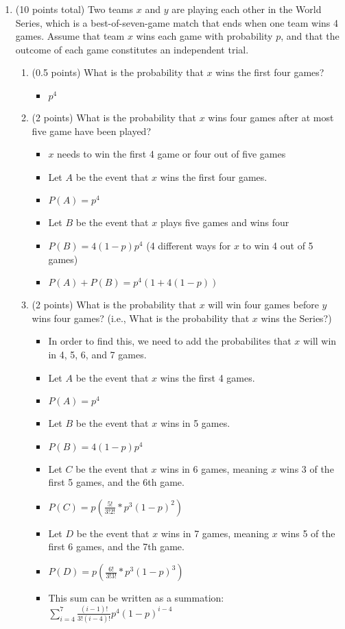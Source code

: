 \documentclass[11pt]{article}
\begin{document}
\begin{enumerate}

\item (10 points total) Two teams $x$ and $y$ are playing each other in the
World Series, which is a best-of-seven-game match that ends when one
team wins 4 games.  Assume that team $x$ wins each game with probability
$p$, and that the outcome of each game constitutes an independent trial.

\begin{enumerate}
\item (0.5 points) What is the probability that $x$ wins the first four games?

\begin{itemize}
	\item $p^{4}$
\end{itemize}

\item (2 points) What is the probability that $x$ wins four games after
at most five game have been played?
\begin{itemize}
	\item $x$ needs to win the first 4 game or four out of five games
	\item Let $A$ be the event that $x$ wins the first four games.
	\item $P(A) = p^{4}$
	\item Let $B$ be the event that $x$ plays five games and wins four
	\item $P(B) = 4(1-p)p^{4}$ (4 different ways for $x$ to win 4 out of 5 
	games)
	\item $P(A) + P(B) = p^{4}(1 + 4(1-p))$
\end{itemize}

\item (2 points) What is the probability that $x$ will win four games before
$y$ wins four games?  (i.e., What is the probability that $x$ wins
the Series?)

\begin{itemize}
	\item In order to find this, we need to add the probabilites that $x$ will
	win in 4, 5, 6, and 7 games.
	\item Let $A$ be the event that $x$ wins the first 4 games.
	\item $P(A) = p^{4}$
	\item Let $B$ be the event that $x$ wins in 5 games.
	\item $P(B) = 4(1-p)p^{4}$
	\item Let $C$ be the event that $x$ wins in 6 games, meaning $x$ wins 3 of 
	the first 5 games, and the 6th game.
	\item $P(C) = p(\frac{5!}{3!2!}*p^{3}(1-p)^2)$
	\item Let $D$ be the event that $x$ wins in 7 games, meaning $x$ wins 5 of
	the first 6 games, and the 7th game.
	\item $P(D) = p(\frac{6!}{3!3!}*p^{3}(1-p)^{3})$
	\item This sum can be written as a summation: 
	$\displaystyle\sum\limits_{i=4}^7 \frac{(i-1)!}{3!(i-4)!}p^{4}(1-p)^{i-4}$
\end{itemize}


\end{enumerate}
\end{enumerate}
\end{document}
